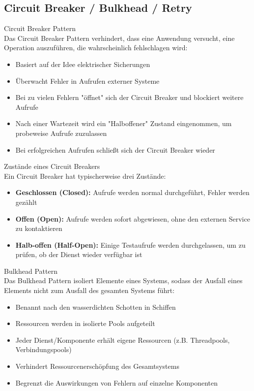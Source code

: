 \subsection{Circuit Breaker / Bulkhead / Retry}

\begin{definition}{Circuit Breaker Pattern}\\
    Das Circuit Breaker Pattern verhindert, dass eine Anwendung versucht, eine Operation auszuführen, die wahrscheinlich fehlschlagen wird:
    \begin{itemize}
        \item Basiert auf der Idee elektrischer Sicherungen
        \item Überwacht Fehler in Aufrufen externer Systeme
        \item Bei zu vielen Fehlern "öffnet" sich der Circuit Breaker und blockiert weitere Aufrufe
        \item Nach einer Wartezeit wird ein "Halboffener" Zustand eingenommen, um probeweise Aufrufe zuzulassen
        \item Bei erfolgreichen Aufrufen schließt sich der Circuit Breaker wieder
    \end{itemize}
\end{definition}

\begin{concept}{Zustände eines Circuit Breakers}\\
    Ein Circuit Breaker hat typischerweise drei Zustände:
    \begin{itemize}
        \item \textbf{Geschlossen (Closed):} Aufrufe werden normal durchgeführt, Fehler werden gezählt
        \item \textbf{Offen (Open):} Aufrufe werden sofort abgewiesen, ohne den externen Service zu kontaktieren
        \item \textbf{Halb-offen (Half-Open):} Einige Testaufrufe werden durchgelassen, um zu prüfen, ob der Dienst wieder verfügbar ist
    \end{itemize}
\end{concept}

\begin{definition}{Bulkhead Pattern}\\
    Das Bulkhead Pattern isoliert Elemente eines Systems, sodass der Ausfall eines Elements nicht zum Ausfall des gesamten Systems führt:
    \begin{itemize}
        \item Benannt nach den wasserdichten Schotten in Schiffen
        \item Ressourcen werden in isolierte Pools aufgeteilt
        \item Jeder Dienst/Komponente erhält eigene Ressourcen (z.B. Threadpools, Verbindungspools)
        \item Verhindert Ressourcenerschöpfung des Gesamtsystems
        \item Begrenzt die Auswirkungen von Fehlern auf einzelne Komponenten
    \end{itemize}
\end{definition}

